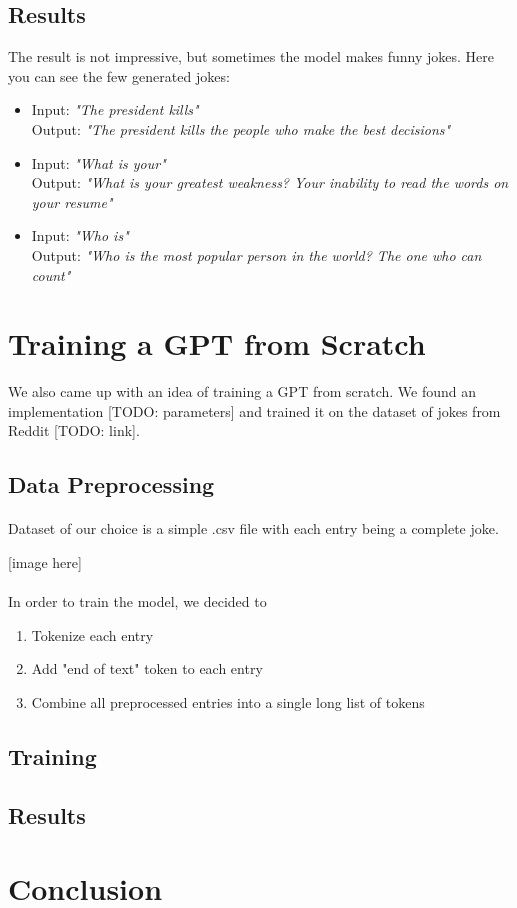 \documentclass[12pt]{article}
\begin{document}
\subsection{Results}
The result is not impressive, but sometimes the model makes funny jokes.
Here you can see the few generated jokes:
\begin{itemize}
    \item Input: \textit{"The president kills"} \\
    Output: \textit{"The president kills the people who make the best decisions"}
    \item Input: \textit{"What is your"} \\
    Output: \textit{"What is your greatest weakness? Your inability to read the words on your resume"}
    \item Input: \textit{"Who is"} \\
    Output: \textit{"Who is the most popular person in the world? The one who can count"}
\end{itemize}

\section{Training a GPT from Scratch}

We also came up with an idea of training a GPT from scratch. We found an implementation [TODO: parameters] and trained it on the dataset
of jokes from Reddit [TODO: link].

\subsection{Data Preprocessing}

\paragraph{}
Dataset of our choice is a simple .csv file with each entry being a complete joke.

[image here]

\paragraph{}
In order to train the model, we decided to
\begin{enumerate}
	\item Tokenize each entry
	\item Add "end of text" token to each entry
	\item Combine all preprocessed entries into a single long list of tokens
\end{enumerate}

\subsection{Training}



\subsection{Results}

\section{Conclusion}
\end{document}
